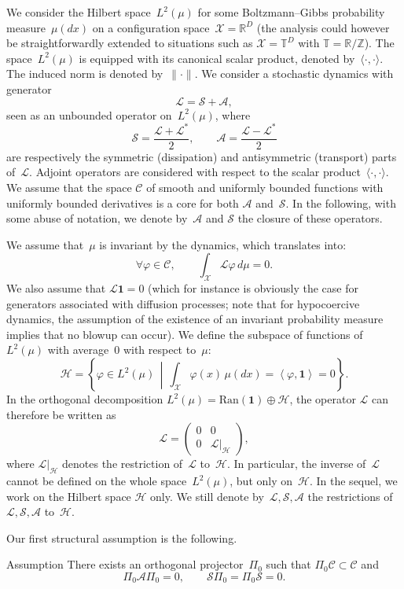 \documentclass[10pt]{amsart}
\theoremstyle{definition}\newtheorem{defi}[theo]{Definition}\newtheorem{rema}[theo]{Remark}\newtheorem{exam}[theo]{Example}\newtheorem{exem}[theo]{Example}\newtheorem{nota}[theo]{Notation}
\newcommand{\Ran}{\mathrm{Ran}}
\newcommand{\cL}{\mathcal{L}}
\newcommand{\cLs}{\mathcal{S}}
\newcommand{\cLa}{\mathcal{A}}
\newcommand{\cX}{\mathcal{X}}
\newcommand{\cH}{\mathcal{H}}
\newcommand{\R}{\mathbb{R}}
\newcommand{\bbZ}{\mathbb{Z}}
\newcommand{\bbT}{\mathbb{T}}
\newcommand{\bfun}{\mathbf{1}}
\newcommand{\scrC}{\mathscr{C}}
\let\oldforall\forall
\renewcommand*{\forall}{\mathrel{\oldforall}}
\begin{document}
We consider the Hilbert space~$L^2(\mu)$ for some Boltzmann--Gibbs probability measure~$\mu(dx)$ on a configuration space~$\cX = \R^D$ (the analysis could however be straightforwardly extended to situations such as $\cX = \bbT^D$ with $\bbT = \R / \bbZ$). The space~$L^2(\mu)$ is equipped with its canonical scalar product, denoted by~$\langle\cdot,\cdot\rangle$. The induced norm is denoted by~$\|\cdot\|$. We consider a stochastic dynamics with generator
\[
\cL = \cLs + \cLa,
\]
seen as an unbounded operator on~$L^2(\mu)$, where
\[
\cLs = \frac{\cL+\cL^*}{2}, \qquad \cLa = \frac{\cL-\cL^*}{2}
\]
are respectively the symmetric (dissipation) and antisymmetric (transport) parts of~$\cL$. Adjoint operators are considered with respect to the scalar product~$\langle\cdot,\cdot\rangle$. We assume that the space $\scrC$ of smooth and uniformly bounded functions with uniformly bounded derivatives is a core for both $\cLa$ and~$\cLs$. In the following, with some abuse of notation, we denote by~$\cLa$ and $\cLs$ the closure of these operators.

We assume that~$\mu$ is invariant by the dynamics, which translates into:
\[
\forall \varphi \in \scrC, \qquad \int_\cX \cL \varphi \, d\mu = 0.
\]
We also assume that $\cL\bfun = 0$ (which for instance is obviously the case for generators associated with diffusion processes; note that for hypocoercive dynamics, the assumption of the existence of an invariant probability measure implies that no blowup can occur). We define the subspace of functions of~$L^2(\mu)$ with average~0 with respect to~$\mu$:
\[
\cH = \left\{ \varphi \in L^2(\mu) \, \middle| \, \int_\cX \varphi(x) \, \mu(dx) = \left\langle \varphi,\bfun\right\rangle = 0 \right\}.
\]
In the orthogonal decomposition $L^2(\mu) = \Ran(\bfun) \oplus \cH$, the operator $\cL$ can therefore be written as
\[
\cL =
\begin{pmatrix} 0 & 0 \\
0 & \cL|_\cH
\end{pmatrix},
\]
where $\cL|_\cH$ denotes the restriction of~$\cL$ to~$\cH$. In particular, the inverse of~$\cL$ cannot be defined on the whole space~$L^2(\mu)$, but only on~$\cH$. In the sequel, we work on the Hilbert space $\cH$ only. We still denote by~$\cL,\cLs,\cLa$ the restrictions of~$\cL,\cLs,\cLa$ to~$\cH$.

Our first structural assumption is the following.

\begin{enonce}
{Assumption}\label{ass:structural_Pi}
There exists an orthogonal projector~$\Pi_{0}$ such that $\Pi_{0}
\scrC \subset \scrC$ and
\begin{equation}\label{eq:conditions_L_Pi}
\Pi_{0} \cLa \Pi_{0} = 0, \qquad \cLs \Pi_{0} = \Pi_{0} \cLs = 0.
\end{equation}
\end{enonce}
\end{document}

